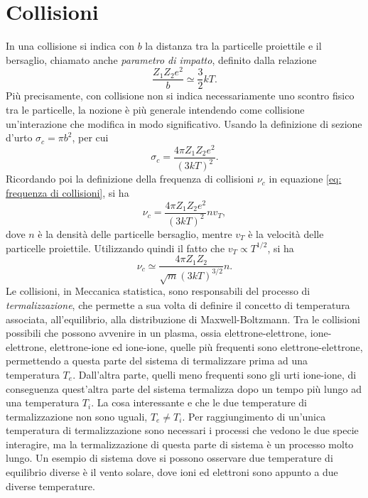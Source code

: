 \section{Collisioni}
In una collisione si indica con $b$ la distanza tra la particelle proiettile e il bersaglio, chiamato anche \emph{parametro di impatto}, definito dalla relazione 
\begin{equation}
    \frac{Z_1Z_2e^2}{b} \simeq \frac{3}{2}kT.
\end{equation}
Più precisamente, con collisione non si indica necessariamente uno scontro fisico tra le particelle, la nozione è più generale intendendo come collisione un'interazione che modifica in modo significativo. Usando la definizione di sezione d'urto $\sigma_c = \pi b^2$, per cui 
\begin{equation}
    \sigma_c = \frac{4\pi Z_1Z_2 e^2}{(3kT)^2}.
\end{equation}
Ricordando poi la definizione della frequenza di collisioni $\nu_c$ in equazione \eqref{eq: frequenza di collisioni}, si ha
\begin{equation}
    \nu_c = \frac{4\pi Z_1Z_2 e^2}{(3kT)^2}nv_T,
\end{equation}
dove $n$ è la densità delle particelle bersaglio, mentre $v_T$ è la velocità delle particelle proiettile. Utilizzando quindi il fatto che $v_T \propto T^{1/2}$, si ha 
\begin{equation}
    \nu_c \simeq \frac{4\pi Z_1Z_2}{\sqrt{m}(3kT)^{3/2}}n.
\end{equation}
Le collisioni, in Meccanica statistica, sono responsabili del processo di \emph{termalizzazione}, che permette a sua volta di definire il concetto di temperatura associata, all'equilibrio, alla distribuzione di Maxwell-Boltzmann. Tra le collisioni possibili che possono avvenire in un plasma, ossia elettrone-elettrone, ione-elettrone, elettrone-ione ed ione-ione, quelle più frequenti sono elettrone-elettrone, permettendo a questa parte del sistema di termalizzare prima ad una temperatura $T_e$. Dall'altra parte, quelli meno frequenti sono gli urti ione-ione, di conseguenza quest'altra parte del sistema termalizza dopo un tempo più lungo ad una temperatura $T_i$. La cosa interessante e che le due temperature di termalizzazione non sono uguali, $T_e \neq T_i$. Per raggiungimento di un'unica temperatura di termalizzazione sono necessari i processi che vedono le due specie interagire, ma la termalizzazione di questa parte di sistema è un processo molto lungo. Un esempio di sistema dove si possono osservare due temperature di equilibrio diverse è il vento solare, dove ioni ed elettroni sono appunto a due diverse temperature. 

